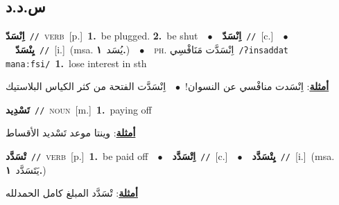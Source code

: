 \documentclass[10pt,a4paper,twoside]{article} %
\begin{document}
\begin{multicols}{2}
\vspace{-3mm}
\subsection*{\color{blue}\foreignlanguage{arabic}{س.د.د}\color{blue}{}} 

{\setlength\topsep{0pt}\textbf{\foreignlanguage{arabic}{اِنْسَدّ}}\ {\color{gray}\texttt{//}\color{black}}\ \textsc{verb}\ [p.]\ \textbf{1.}~be plugged.  \textbf{2.}~be shut\ \ $\bullet$\ \ \setlength\topsep{0pt}\textbf{\foreignlanguage{arabic}{اِنْسَدّ}}\ {\color{gray}\texttt{//}\color{black}}\ [c.]\ \ $\bullet$\ \ \setlength\topsep{0pt}\textbf{\foreignlanguage{arabic}{يِنْسَدّ}}\ {\color{gray}\texttt{//}\color{black}}\ [i.]\ \color{gray}(msa. \foreignlanguage{arabic}{يُسَد}~\foreignlanguage{arabic}{\textbf{١.}})\color{black}\ \ $\bullet$\ \ \textsc{ph.} \color{gray} \foreignlanguage{arabic}{اِنْسَدَّت مَنَافْسِي}\color{black}\ {\color{gray}\texttt{/{\sffamily ʔinsaddat manaːfsi}/}\color{black}}\ \textbf{1.}~lose interest in sth\  \begin{flushright}\color{gray}\foreignlanguage{arabic}{\textbf{\underline{\foreignlanguage{arabic}{أمثلة}}}: اِنْسَدت منافْسي عن النسوان!\ $\bullet$\ \  اِنْسَدَّت الفتحة من كثر الكياس البلاستيك}\end{flushright}\color{black}} \vspace{2mm}

{\setlength\topsep{0pt}\textbf{\foreignlanguage{arabic}{تَسْدِيد}}\ {\color{gray}\texttt{//}\color{black}}\ \textsc{noun}\ [m.]\ \textbf{1.}~paying off\  \begin{flushright}\color{gray}\foreignlanguage{arabic}{\textbf{\underline{\foreignlanguage{arabic}{أمثلة}}}: وينتا موعد تَسْديد الأقساط}\end{flushright}\color{black}} \vspace{2mm}

{\setlength\topsep{0pt}\textbf{\foreignlanguage{arabic}{تْسَدَّد}}\ {\color{gray}\texttt{//}\color{black}}\ \textsc{verb}\ [p.]\ \textbf{1.}~be paid off\ \ $\bullet$\ \ \setlength\topsep{0pt}\textbf{\foreignlanguage{arabic}{اِتْسَدَّد}}\ {\color{gray}\texttt{//}\color{black}}\ [c.]\ \ $\bullet$\ \ \setlength\topsep{0pt}\textbf{\foreignlanguage{arabic}{يِتْسَدَّد}}\ {\color{gray}\texttt{//}\color{black}}\ [i.]\ \color{gray}(msa. \foreignlanguage{arabic}{يَتَسَدَّد}~\foreignlanguage{arabic}{\textbf{١.}})\color{black}\  \begin{flushright}\color{gray}\foreignlanguage{arabic}{\textbf{\underline{\foreignlanguage{arabic}{أمثلة}}}: تْسَدَّد المبلغ كامل الحمدلله}\end{flushright}\color{black}} \vspace{2mm}


\end{multicols}
\end{document}
